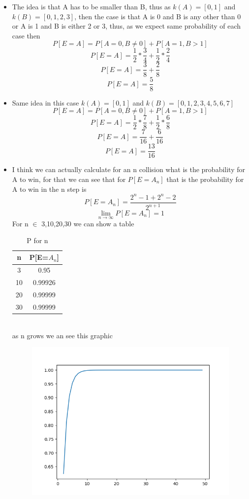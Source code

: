 \documentclass{assignment}
\begin{document}
\begin{itemize}
  \item The idea is that A has to be smaller than B, thus as $k(A) = [0,1]$ and
    $k(B)=[0,1,2,3]$, then the case is that A is 0 and B is any other than 0 or
    A is 1 and B is either 2 or 3, thus, as we expect same probability of each
    case then
    $$P[E=A] = P[A=0,B\neq0] + P[A=1,B>1]$$
    $$P[E=A] = \frac{1}{2}*\frac{3}{4}+ \frac{1}{2}*\frac{2}{4}  $$
    $$P[E=A] = \frac{3}{8} + \frac{2}{8}  $$
    $$P[E=A] = \frac{5}{8} $$
  \item Same idea in this case $k(A) =[0,1]$ and $k(B) = [0,1,2,3,4,5,6,7]$
    $$P[E=A] = P[A=0,B\neq0] + P[A=1,B>1]$$
    $$P[E=A] = \frac{1}{2}*\frac{7}{8}+ \frac{1}{2}*\frac{6}{8}  $$
    $$P[E=A] = \frac{7}{16} + \frac{6}{16}  $$
    $$P[E=A] = \frac{13}{16} $$
  \item I think we can actually calculate for an n collision what is the
    probability for A to win, for that we can see that for $P[E=A_n]$ that is
    the probability for A to win in the n step is
    $$P[E=A_n] = \frac{2^{n}-1 + 2^{n}-2}{2^{n+1}}$$
    $$\lim_{n \to \infty} P[E=A_n] = 1$$
    For n $\in$ 3,10,20,30 we can show a table
    \begin{table}[h]
      \begin{center}
        \begin{tabular}[c]{c|c}
          \hline
          \multicolumn{1}{c|}{\textbf{n}} & 
          \multicolumn{1}{c}{\textbf{P[E=$A_n$]}} \\
          \hline
          3  &  0.95\\
          10 &  0.99926\\
          20 &  0.99999\\
          30 &  0.99999\\
          \hline
        \end{tabular}
      \caption{P for n}
    \end{center}
    \end{table}
    \\as n grows we an see this graphic 
    \begin{figure}[h]
    \begin{center}
      \includegraphics[scale=0.5]{figures/1.png}

\end{center}
\end{figure}
\end{itemize}
\end{document}
